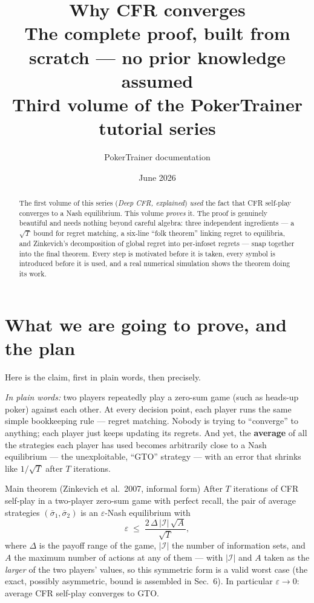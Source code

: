 \documentclass[11pt,a4paper]{article}
\title{\bfseries Why CFR converges\\[2mm]
\large The complete proof, built from scratch --- no prior knowledge assumed\\[1mm]
\normalsize Third volume of the PokerTrainer tutorial series}
\author{PokerTrainer documentation}
\date{June 2026}
\begin{document}
\maketitle

\begin{abstract}
The first volume of this series (\emph{Deep CFR, explained}) \emph{used} the
fact that CFR self-play converges to a Nash equilibrium. This volume
\emph{proves} it. The proof is genuinely beautiful and needs nothing beyond
careful algebra: three independent ingredients --- a $\sqrt{T}$ bound for
regret matching, a six-line ``folk theorem'' linking regret to equilibria, and
Zinkevich's decomposition of global regret into per-infoset regrets --- snap
together into the final theorem. Every step is motivated before it is taken,
every symbol is introduced before it is used, and a real numerical simulation
shows the theorem doing its work.
\end{abstract}

\tableofcontents
\newpage

\section{What we are going to prove, and the plan}

Here is the claim, first in plain words, then precisely.

\emph{In plain words:} two players repeatedly play a zero-sum game (such as
heads-up poker) against each other. At every decision point, each player runs
the same simple bookkeeping rule --- regret matching. Nobody is trying to
``converge'' to anything; each player just keeps updating its regrets. And
yet, the \textbf{average} of all the strategies each player has used becomes
arbitrarily close to a Nash equilibrium --- the unexploitable, ``GTO''
strategy --- with an error that shrinks like $1/\sqrt{T}$ after $T$
iterations.

\begin{thmbox}{Main theorem (Zinkevich et al.\ 2007, informal form)}
After $T$ iterations of CFR self-play in a two-player zero-sum game with
perfect recall, the pair of average strategies $(\bar\sigma_1,\bar\sigma_2)$
is an $\varepsilon$-Nash equilibrium with
\[
\varepsilon \;\le\; \frac{2\,\Delta\,|\mathcal{I}|\,\sqrt{A}}{\sqrt{T}},
\]
where $\Delta$ is the payoff range of the game, $|\mathcal{I}|$ the number of
information sets, and $A$ the maximum number of actions at any of them --- with
$|\mathcal{I}|$ and $A$ taken as the \emph{larger} of the two players' values,
so this symmetric form is a valid worst case (the exact, possibly asymmetric,
bound is assembled in Sec.~6). In particular $\varepsilon \to 0$: average CFR
self-play converges to GTO.
\end{thmbox}
\end{document}
